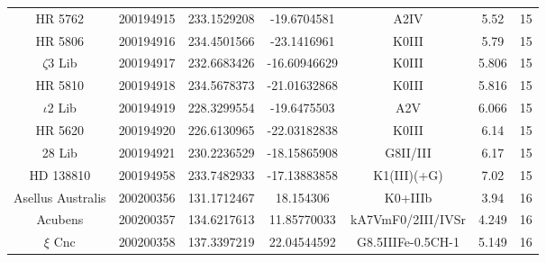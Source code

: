 \begin{table*}
\begin{tabular}{ccccccc}
HR 5762 & 200194915 & 233.1529208 & -19.6704581 & A2IV & 5.52 & 15 \\
HR 5806 & 200194916 & 234.4501566 & -23.1416961 & K0III & 5.79 & 15 \\
$\zeta$3 Lib & 200194917 & 232.6683426 & -16.60946629 & K0III & 5.806 & 15 \\
HR 5810 & 200194918 & 234.5678373 & -21.01632868 & K0III & 5.816 & 15 \\
$\iota$2 Lib & 200194919 & 228.3299554 & -19.6475503 & A2V & 6.066 & 15 \\
HR 5620 & 200194920 & 226.6130965 & -22.03182838 & K0III & 6.14 & 15 \\
28 Lib & 200194921 & 230.2236529 & -18.15865908 & G8II/III & 6.17 & 15 \\
HD 138810 & 200194958 & 233.7482933 & -17.13883858 & K1(III)(+G) & 7.02 & 15 \\
Asellus Australis & 200200356 & 131.1712467 & 18.154306 & K0+IIIb & 3.94 & 16 \\
Acubens & 200200357 & 134.6217613 & 11.85770033 & kA7VmF0/2III/IVSr & 4.249 & 16 \\
$\xi$ Cnc & 200200358 & 137.3397219 & 22.04544592 & G8.5IIIFe-0.5CH-1 & 5.149 & 16 \\
\hline
\end{tabular}
\end{table*}
